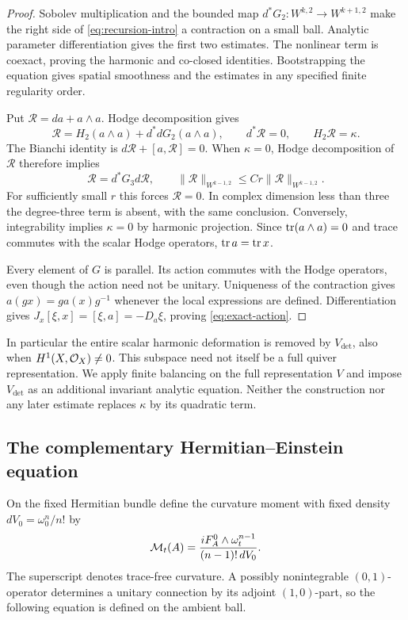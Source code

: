 \begin{proof}
Sobolev multiplication and the bounded map
$d^*G_2:W^{k,2}\to W^{k+1,2}$ make the right side of
\eqref{eq:recursion-intro} a contraction on a small ball.
Analytic parameter differentiation gives the first two estimates.
The nonlinear term is coexact, proving the harmonic and co-closed
identities. Bootstrapping the equation gives spatial smoothness and
the estimates in any specified finite regularity order.

Put $\mathcal R=da+a\wedge a$. Hodge decomposition gives
\[
 \mathcal R=H_2(a\wedge a)+d^*dG_2(a\wedge a),\qquad
 d^*\mathcal R=0,\qquad H_2\mathcal R=\kappa.
\]
The Bianchi identity is $d\mathcal R+[a,\mathcal R]=0$.
When $\kappa=0$, Hodge decomposition of $\mathcal R$ therefore implies
\[
 \mathcal R=d^*G_3d\mathcal R,\qquad
 \|\mathcal R\|_{W^{k-1,2}}\le Cr\|\mathcal R\|_{W^{k-1,2}}.
\]
For sufficiently small $r$ this forces $\mathcal R=0$.
In complex dimension less than three the degree-three term is absent,
with the same conclusion. Conversely, integrability implies $\kappa=0$
by harmonic projection. Since $\operatorname{tr}(a\wedge a)=0$ and trace commutes
with the scalar Hodge operators, $\operatorname{tr} a=\operatorname{tr} x$.

Every element of $G$ is parallel. Its action commutes with the Hodge
operators, even though the action need not be unitary. Uniqueness of
the contraction gives $a(gx)=ga(x)g^{-1}$ whenever the local expressions
are defined. Differentiation gives
$J_x[\xi,x]=[\xi,a]=-D_a\xi$, proving \eqref{eq:exact-action}.
\end{proof}

In particular the entire scalar harmonic deformation is removed by
$V_{\det}$, also when $H^1(X,\mathcal O_X)\ne0$.
This subspace need not itself be a full quiver representation.
We apply finite balancing on the full representation $V$ and impose
$V_{\det}$ as an additional invariant analytic equation.
Neither the construction nor any later estimate replaces $\kappa$
by its quadratic term.

\subsection{The complementary Hermitian--Einstein equation}

On the fixed Hermitian bundle define the curvature moment with fixed
density $dV_0=\omega_0^n/n!$ by
\begin{equation}\label{eq:curvature-moment}
 \mathcal M_t(A)=
 \frac{iF_A^0\wedge\omega_t^{n-1}}{(n-1)!\,dV_0}.
\end{equation}
The superscript denotes trace-free curvature. A possibly nonintegrable
$(0,1)$-operator determines a unitary connection by its adjoint
$(1,0)$-part, so the following equation is defined on the ambient ball.

